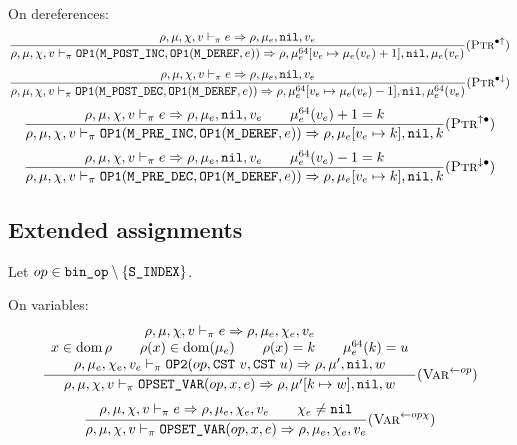 On dereferences:
\[\dfrac{
    \rho,\mu,\chi,v \vdash_\pi e\Rightarrow \rho,\mu_e,\texttt{nil},v_e
}{\rho,\mu,\chi,v \vdash_\pi \texttt{OP1}(\texttt{M\_POST\_INC}, \texttt{OP1}(\texttt{M\_DEREF}, e)) \Rightarrow \rho,\mu_e^{64}[v_e\mapsto \mu_e(v_e)+1],\texttt{nil},\mu_e(v_e)} (\textsc{Ptr}^{\bullet\uparrow})\]
\[\dfrac{
    \rho,\mu,\chi,v \vdash_\pi e\Rightarrow \rho,\mu_e,\texttt{nil},v_e
}{\rho,\mu,\chi,v \vdash_\pi \texttt{OP1}(\texttt{M\_POST\_DEC}, \texttt{OP1}(\texttt{M\_DEREF}, e)) \Rightarrow \rho,\mu_e^{64}[v_e\mapsto \mu_e(v_e)-1],\texttt{nil},\mu_e^{64}(v_e)} (\textsc{Ptr}^{\bullet\downarrow})\]
\[\dfrac{
    \rho,\mu,\chi,v \vdash_\pi e\Rightarrow \rho,\mu_e,\texttt{nil},v_e \qquad \mu_e^{64}(v_e)+1 = k
}{\rho,\mu,\chi,v \vdash_\pi \texttt{OP1}(\texttt{M\_PRE\_INC}, \texttt{OP1}(\texttt{M\_DEREF}, e)) \Rightarrow \rho,\mu_e[v_e\mapsto k],\texttt{nil},k} (\textsc{Ptr}^{\uparrow \bullet})\]
\[\dfrac{
    \rho,\mu,\chi,v \vdash_\pi e\Rightarrow \rho,\mu_e,\texttt{nil},v_e \qquad \mu_e^{64}(v_e)-1 = k
}{\rho,\mu,\chi,v \vdash_\pi \texttt{OP1}(\texttt{M\_PRE\_DEC}, \texttt{OP1}(\texttt{M\_DEREF}, e)) \Rightarrow \rho,\mu_e[v_e\mapsto k],\texttt{nil},k} (\textsc{Ptr}^{\downarrow \bullet})\]

\subsection{Extended assignments}
Let \(op\in \texttt{bin\_op}\setminus \{ \texttt{S\_INDEX} \}\).

On variables:
\[\dfrac{\begin{array}{c}
    \rho,\mu,\chi,v \vdash_\pi e\Rightarrow \rho,\mu_e,\chi_e,v_e \\
    x\in\operatorname{dom}\rho \qquad \rho(x)\in\operatorname{dom}(\mu_e) \qquad \rho(x) = k \qquad \mu_e^{64}(k) = u \\
    \rho,\mu_e,\chi_e,v_e \vdash_\pi \texttt{OP2}(op, \texttt{CST}\ v, \texttt{CST}\ u) \Rightarrow \rho,\mu',\texttt{nil},w
\end{array}}{\rho,\mu,\chi,v \vdash_\pi \texttt{OPSET\_VAR}(op, x, e) \Rightarrow \rho,\mu'[k\mapsto w],\texttt{nil},w} (\textsc{Var}^{\gets op})\]
\[\dfrac{\begin{array}{c}
    \rho,\mu,\chi,v \vdash_\pi e\Rightarrow \rho,\mu_e,\chi_e,v_e \qquad \chi_e\ne\texttt{nil}\\
\end{array}}{\rho,\mu,\chi,v \vdash_\pi \texttt{OPSET\_VAR}(op, x, e) \Rightarrow \rho,\mu_e,\chi_e,v_e} (\textsc{Var}^{\gets op\chi})\]

